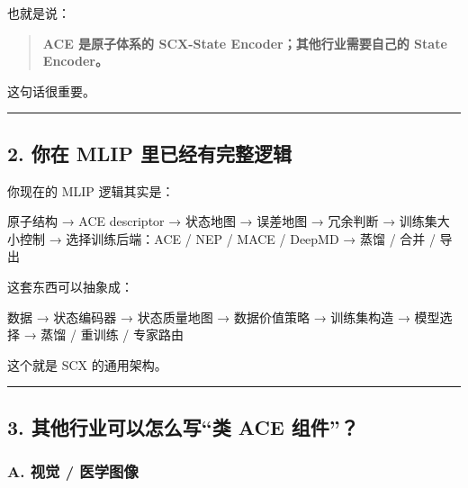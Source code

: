 \documentclass[
  12pt,
]{ctexart}
\newenvironment{Shaded}{}{}
\newcommand{\NormalTok}[1]{#1}
\begin{document}
也就是说：

\begin{quote}
\textbf{ACE 是原子体系的 SCX-State Encoder；其他行业需要自己的 State
Encoder。}
\end{quote}

这句话很重要。

\begin{center}\rule{0.5\linewidth}{0.5pt}\end{center}

\subsection{2. 你在 MLIP
里已经有完整逻辑}\label{ux4f60ux5728-mlip-ux91ccux5df2ux7ecfux6709ux5b8cux6574ux903bux8f91}

你现在的 MLIP 逻辑其实是：

\begin{Shaded}
\begin{Highlighting}[]
\NormalTok{原子结构}
\NormalTok{→ ACE descriptor}
\NormalTok{→ 状态地图}
\NormalTok{→ 误差地图}
\NormalTok{→ 冗余判断}
\NormalTok{→ 训练集大小控制}
\NormalTok{→ 选择训练后端：ACE / NEP / MACE / DeepMD}
\NormalTok{→ 蒸馏 / 合并 / 导出}
\end{Highlighting}
\end{Shaded}

这套东西可以抽象成：

\begin{Shaded}
\begin{Highlighting}[]
\NormalTok{数据}
\NormalTok{→ 状态编码器}
\NormalTok{→ 状态质量地图}
\NormalTok{→ 数据价值策略}
\NormalTok{→ 训练集构造}
\NormalTok{→ 模型选择}
\NormalTok{→ 蒸馏 / 重训练 / 专家路由}
\end{Highlighting}
\end{Shaded}

这个就是 SCX 的通用架构。

\begin{center}\rule{0.5\linewidth}{0.5pt}\end{center}

\subsection{3. 其他行业可以怎么写``类 ACE
组件''？}\label{ux5176ux4ed6ux884cux4e1aux53efux4ee5ux600eux4e48ux5199ux7c7b-ace-ux7ec4ux4ef6}

\subsubsection{A. 视觉 /
医学图像}\label{a.-ux89c6ux89c9-ux533bux5b66ux56feux50cf}
\end{document}
